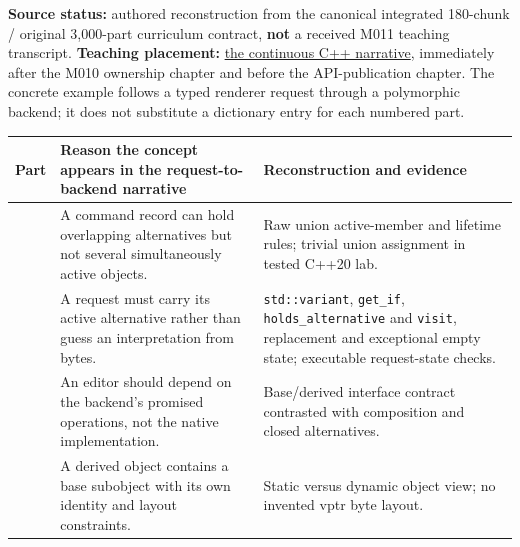 \textbf{Source status:} authored reconstruction from the canonical integrated 180-chunk / original 3,000-part curriculum contract, \textbf{not} a received M011 teaching transcript. \textbf{Teaching placement:} \href{Continuous\%20Notes/Computing\%20Foundations\%20-\%20From\%20Bits\%20to\%20C++\%20and\%20Systems\%20APIs\#From\%20one\%20owned\%20resource\%20to\%20many\%20requests\%20and\%20a\%20replaceable\%20backend}{the continuous C++ narrative}, immediately after the M010 ownership chapter and before the API-publication chapter. The concrete example follows a typed renderer request through a polymorphic backend; it does not substitute a dictionary entry for each numbered part.

{\def\LTcaptype{none} %
\begin{longtable}[]{@{}
  >{\raggedright\arraybackslash}p{}
  >{\raggedright\arraybackslash}p{}
  >{\raggedright\arraybackslash}p{}@{}}
\toprule\noalign{}
\begin{minipage}[b]{\linewidth}\raggedright
Part
\end{minipage} & \begin{minipage}[b]{\linewidth}\raggedright
Reason the concept appears in the request-to-backend narrative
\end{minipage} & \begin{minipage}[b]{\linewidth}\raggedright
Reconstruction and evidence
\end{minipage} \\
\midrule\noalign{}
\endhead
\bottomrule\noalign{}
\endlastfoot
161 & A command record can hold overlapping alternatives but not several simultaneously active objects. & Raw union active-member and lifetime rules; trivial union assignment in tested C++20 lab. \\
162 & A request must carry its active alternative rather than guess an interpretation from bytes. & \texttt{std::variant}, \texttt{get\_if}, \texttt{holds\_alternative} and \texttt{visit}, replacement and exceptional empty state; executable request-state checks. \\
163 & An editor should depend on the backend's promised operations, not the native implementation. & Base/derived interface contract contrasted with composition and closed alternatives. \\
164 & A derived object contains a base subobject with its own identity and layout constraints. & Static versus dynamic object view; no invented vptr byte layout. \\

\end{longtable}}
